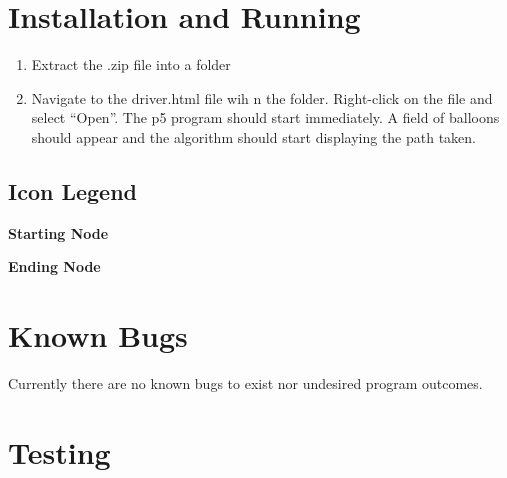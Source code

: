 \documentclass{article}
\begin{document}
\newpage

\section{Installation and Running}

\begin{enumerate}
\item Extract the .zip file into a folder
\item Navigate to the driver.html file wih n the folder. Right-click on the file and select “Open”. The p5 program should start immediately. A field of balloons should appear and the algorithm should start displaying the path taken.
\end{enumerate}

\subsection{Icon Legend}

\begin{center}
\large \textbf{Starting Node}


\end{center}

\vspace*{7px}

\begin{center}
\large \textbf{Ending Node}


\end{center}

\section{Known Bugs}

Currently there are no known bugs to exist nor undesired program outcomes.

\section{Testing}
\end{document}
